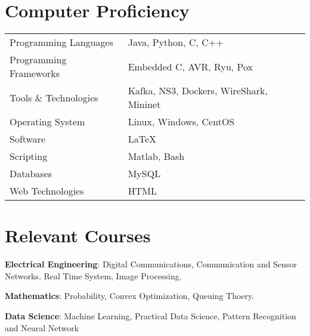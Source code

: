 \documentclass[10pt]{article}
\begin{document}
%
 
\section*{Computer Proficiency}
\begin{tabular}{l l}
Programming Languages & Java, Python, C, C++\\
Programming Frameworks & Embedded C, AVR, Ryu, Pox \\
Tools \& Technologies & Kafka, NS3, Dockers, WireShark, Mininet\\
Operating System & {\sc Linux}, Windows, CentOS\\
Software & {\LaTeX}\\
Scripting & {\sc Matlab}, Bash\\
Databases & MySQL\\
Web Technologies & HTML
\end{tabular}

\section*{Relevant Courses}
\begin{shortlist}
\item \textbf{Electrical Engineering}: 
 Digital Communications, Communication and Sensor Networks, Real Time System, Image Processing.
\item \textbf{Mathematics}: 
Probability, Convex Optimization, Queuing Thoery.
\item \textbf{Data Science}: 
 Machine Learning, Practical Data Science, Pattern Recognition and Neural Network
\end{shortlist}
\end{document}
